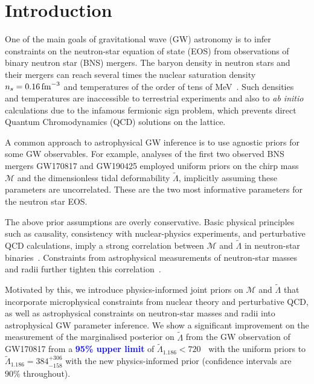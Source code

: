 \documentclass[twocolumn,linenumbers]{aastex631}
\newcommand{\blue}[1]{\textcolor{blue}{\textbf{#1}}}
\begin{document}
		
\section{Introduction}
\label{sec:Intro}
	
One of the main goals of gravitational wave (GW) astronomy is to infer
constraints on the neutron-star equation of state (EOS) from observations
of binary neutron star (BNS) mergers. The baryon density in neutron stars
and their mergers can reach several times the nuclear saturation density
$n_s=0.16\,{\rm fm}^{-3}$ and temperatures of the order of tens of
MeV~\citep[see, e.g.,][for reviews]{Baiotti2016,
  Paschalidis2016,Radice2020b}. Such densities and temperatures are
inaccessible to terrestrial experiments and also to \textit{ab initio}
calculations due to the infamous fermionic sign problem, which prevents
direct Quantum Chromodynamics (QCD) solutions on the lattice.

A common approach to astrophysical GW inference is to use agnostic priors
for some GW observables. For example, analyses of the first two observed
BNS mergers GW170817 \citep[e.g.,][]{abbott17_170817observation,
  abbott18_170817EOS, abbott19_170817Properties} and GW190425
\citep[e.g.,][]{abbott20_190425} employed uniform priors on the chirp
mass $\mathcal{M}$ and the dimensionless tidal deformability
$\tilde{\Lambda}$, implicitly assuming these parameters are
uncorrelated. These are the two most informative parameters for the
neutron star EOS.

The above prior assumptions are overly conservative. Basic physical
principles such as causality, consistency with nuclear-physics
experiments, and perturbative QCD calculations, imply a strong
correlation between $\mathcal{M}$ and $\tilde{\Lambda}$ in neutron-star
binaries~\citep{Altiparmak:2022}. Constraints from astrophysical
measurements of neutron-star masses and radii further tighten this
correlation~\citep{Ecker:2022, Ecker:2022dlg}.

Motivated by this, we introduce physics-informed joint priors on
$\mathcal{M}$ and $\tilde{\Lambda}$ that incorporate microphysical
constraints from nuclear theory and perturbative QCD, as well as
astrophysical constraints on neutron-star masses and radii into
astrophysical GW parameter inference. We show a significant improvement
on the measurement of the marginalised posterior on $\tilde{\Lambda}$
from the GW observation of GW170817 from a \blue{95\% upper limit} of
$\tilde{\Lambda}_{1.186} < 720$\blue{~\citep{abbott19_170817Properties}}
with the uniform priors to $\tilde{\Lambda}_{1.186} = 384^{+306}_{-158}$
with the new physics-informed prior (confidence intervals are $90\%$
throughout).
\end{document}
